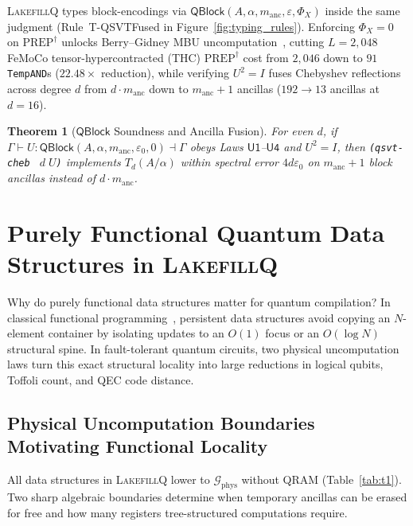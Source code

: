 \documentclass[acmsmall,screen,anonymous]{acmart}
\DeclareRobustCommand{\_}{\ifmmode\text{\char95}\else\char95\penalty0\relax\fi}
\theoremstyle{plain}
\newtheorem{theorem}{Theorem}[section]
\newcommand{\LakefillQ}{\textsc{LakefillQ}}
\newcommand{\QBlock}{\ensuremath{\mathsf{QBlock}}}
\newcommand{\Gphys}{\ensuremath{\mathcal{G}_{\mathrm{phys}}}}
\begin{document}
\LakefillQ{} types block-encodings via $\QBlock(A, \alpha, m_{\mathrm{anc}}, \varepsilon, \Phi_X)$ inside the same judgment (Rule~\textsf{T-QSVTFused} in Figure~\ref{fig:typing_rules}). Enforcing $\Phi_X = 0$ on $\mathrm{PREP}^\dagger$ unlocks Berry--Gidney MBU uncomputation~\cite{berry2019}, cutting $L=2{,}048$ FeMoCo tensor-hypercontracted (THC) $\mathrm{PREP}^\dagger$ cost from $2{,}046$ down to $91$ \texttt{TempAND}s ($22.48\times$ reduction), while verifying $U^2 = I$ fuses Chebyshev reflections across degree $d$ from $d \cdot m_{\mathrm{anc}}$ down to $m_{\mathrm{anc}} + 1$ ancillas ($192 \to 13$ ancillas at $d=16$).

\begin{theorem}[$\QBlock$ Soundness and Ancilla Fusion]
\label{thm:t6}
For even $d$, if $\Gamma \vdash U : \QBlock(A, \alpha,\allowbreak m_{\mathrm{anc}}, \varepsilon_0, 0) \dashv \Gamma$ obeys Laws $\mathsf{U1}$--$\mathsf{U4}$ and $U^2 = I$, then \texttt{(qsvt-cheb } $d\; U$\texttt{)} implements $T_d(A/\alpha)$ within spectral error $4 d \varepsilon_0$ on $m_{\mathrm{anc}} + 1$ block ancillas instead of $d \cdot m_{\mathrm{anc}}$.
\end{theorem}
\section{Purely Functional Quantum Data Structures in \LakefillQ{}}
\label{sec:qds}

Why do purely functional data structures matter for quantum compilation? In classical functional programming~\cite{okasaki1998}, persistent data structures avoid copying an $N$-element container by isolating updates to an $O(1)$ focus or an $O(\log N)$ structural spine. In fault-tolerant quantum circuits, two physical uncomputation laws turn this exact structural locality into large reductions in logical qubits, Toffoli count, and QEC code distance.

\subsection{Physical Uncomputation Boundaries Motivating Functional Locality}
\label{sec:uncomp_laws}

All data structures in \LakefillQ{} lower to $\Gphys$ without QRAM (Table~\ref{tab:t1}). Two sharp algebraic boundaries determine when temporary ancillas can be erased for free and how many registers tree-structured computations require.
\end{document}
